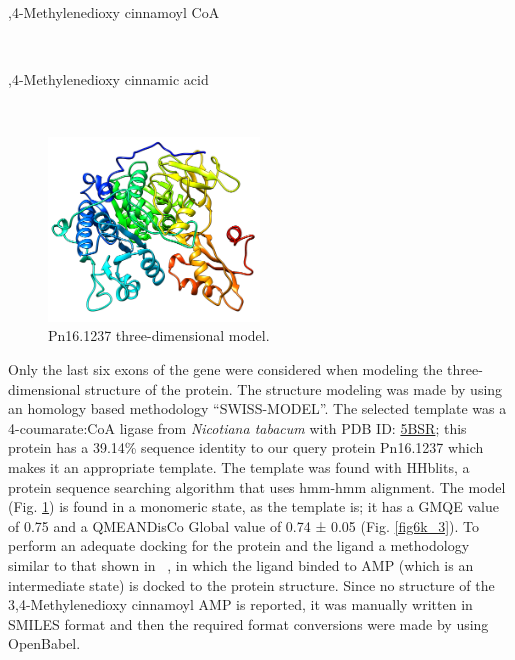 \documentclass[12pt]{article}
\newcommand{\textcite}[1]{\citeauthor{#1}~\citeyear{#1}}
\begin{document}
	\vspace{-50pt}\hspace{0.5\paperwidth-20pt}
	\begin{minipage}{0.345\paperwidth}
		,4-Methylenedioxy cinnamoyl CoA
	\end{minipage}\\

	\vspace{-37pt}
	\begin{minipage}{0.345\paperwidth}
		,4-Methylenedioxy cinnamic acid
	\end{minipage}\\
	
	\FloatBarrier
	\begin{figure}
		\centering
		\includegraphics[width=0.5\textwidth]{../6/known/Minimize/model2.png}
		\caption{Pn16.1237 three-dimensional model.}
		\label{fig6k_2}
	\end{figure}
	\FloatBarrier
	
	Only the last six exons of the gene were considered when modeling the three-dimensional structure of the protein. The structure modeling was made by using an homology based methodology ``SWISS-MODEL''. \cite{swiss} The selected template was a 4-coumarate:CoA ligase from \textit{Nicotiana tabacum} with PDB ID: \href{https://www.rcsb.org/structure/5BSR}{5BSR}; this protein has a 39.14\% sequence identity to our query protein Pn16.1237 which makes it an appropriate template. The template was found with HHblits, a protein sequence searching algorithm that uses hmm-hmm alignment. \cite{hhblits} The model (Fig. \ref{fig6k_2}) is found in a monomeric state, as the template is; it has a GMQE value of 0.75 and a QMEANDisCo Global value of 0.74 ± 0.05 (Fig. \ref{fig6k_3}). \cite{qmeandisco_swiss} To perform an adequate docking for the protein and the ligand a methodology similar to that shown in \textcite{coaligase}, in which the ligand binded to AMP (which is an intermediate state) is docked to the protein structure. Since no structure of the 3,4-Methylenedioxy cinnamoyl AMP is reported, it was manually written in SMILES format and then the required format conversions were made by using OpenBabel. \cite{obabel}
	
\end{document}
